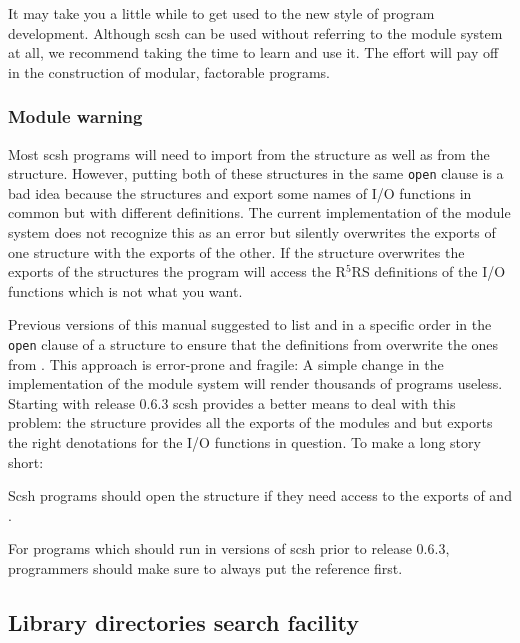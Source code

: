 It may take you a little while to get used to the new style of program
development.
Although scsh can be used without referring to the module system at
all, we recommend taking the time to learn and use it.
The effort will pay off in the construction of modular, factorable programs.

\subsubsection{Module warning}
Most scsh programs will need to import from the  structure
as well as from the  structure. However, putting both of
these structures in the same \texttt{open} clause is a bad idea
because the structures  and  export some names of
I/O functions in common but with different definitions.  The current
implementation of the module system does not recognize this as an
error but silently overwrites the exports of one structure with the
exports of the other.  If the  structure overwrites the
exports of the  structures the program will access the
R$^5$RS definitions of the I/O functions which is not what you want.

Previous versions of this manual suggested to list  and
 in a specific order in the \texttt{open} clause of a
structure to ensure that the definitions from  overwrite the
ones from . This approach is error-prone and fragile: A
simple change in the implementation of the module system will render
thousands of programs useless.  Starting with release 0.6.3 scsh
provides a better means to deal with this problem: the structure
 provides all the exports of the modules
 and  but exports the right denotations for the
I/O functions in question. To make a long story short:
\begin{center}
  Scsh programs should open the structure  if
  they need access to the exports of  and .
\end{center}

For programs which should run in versions of scsh prior to release
0.6.3, programmers should make sure to always put the 
reference first.

\subsection{Library directories search facility}
\label{sec:lib-dirs}

